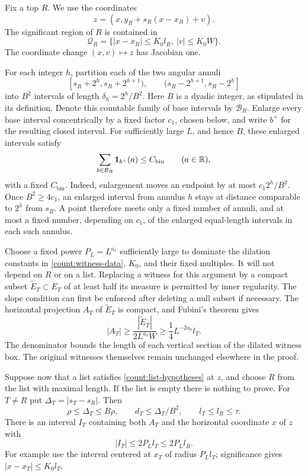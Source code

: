 Fix a top $R$.  We use the coordinates
\[
 z=(x,y_R+s_R(x-x_R)+v).
\]
The significant region of $R$ is contained in
\begin{equation}\label{count:reference-box}
 \mathcal Q_R=\{|x-x_R|\leq K_0l_R,\ |v|\leq K_0W\}.
\end{equation}
The coordinate change $(x,v)\mapsto z$ has Jacobian one.

For each integer $h$, partition each of the two angular annuli
\[
 [s_R+2^h,s_R+2^{h+1}),\qquad
 (s_R-2^{h+1},s_R-2^h]
\]
into $B^2$ intervals of length $\delta_h=2^h/B^2$.
Here $B$ is a dyadic integer, as stipulated in its definition.
Denote this countable family of base intervals by
$\mathcal B_R$.  Enlarge every base interval concentrically by
a fixed factor $c_1$, chosen below, and write $b^+$ for the
resulting closed interval.  For sufficiently large $L$, and hence
$B$, these enlarged intervals satisfy
\begin{equation}\label{count:bin-overlap}
 \sum_{b\in\mathcal B_R}\mathbf 1_{b^+}(a)\leq C_{\mathrm{bin}}
 \qquad(a\in\mathbb R),
\end{equation}
with a fixed $C_{\mathrm{bin}}$.  Indeed, enlargement moves an
endpoint by at most $c_1 2^h/B^2$.  Once $B^2\geq4c_1$, an
enlarged interval from annulus $h$ stays at distance comparable
to $2^h$ from $s_R$.  A point therefore meets only a fixed number
of annuli, and at most a fixed number, depending on $c_1$, of
the enlarged equal-length intervals in each such annulus.

Choose a fixed power $P_L=L^{a_1}$ sufficiently large to dominate
the dilation constants in \eqref{count:witness-data}, $K_0$,
and their fixed multiples.  It will not depend on $R$ or on a
list.  Replacing a witness for this argument by a compact subset
$\widetilde E_T\subset E_T$ of at least half its measure is
permitted by inner regularity.  The slope condition can first
be enforced after deleting a null subset if necessary.  The
horizontal projection $A_T$ of $\widetilde E_T$ is compact, and
Fubini's theorem gives
\begin{equation}\label{count:projection-size}
 |A_T|\geq \frac{|\widetilde E_T|}{2L^{a_0}W}
          \geq \frac14L^{-2a_0}l_T.
\end{equation}
The denominator bounds the length of each vertical section of
the dilated witness box.  The original witnesses themselves
remain unchanged elsewhere in the proof.

Suppose now that a list satisfies \eqref{count:list-hypotheses}
at $z$, and choose $R$ from the list with maximal length.  If
the list is empty there is nothing to prove.  For $T\ne R$ put
$\Delta_T=|s_T-s_R|$.  Then
\begin{equation}\label{count:relative-precision}
 \rho\leq\Delta_T\leq B\rho,\qquad
 d_T\leq\Delta_T/B^2,\qquad l_T\leq l_R\leq\tau.
\end{equation}
There is an interval $I_T$ containing both $A_T$ and the horizontal
coordinate $x$ of $z$ with
\begin{equation}\label{count:witness-interval}
 |I_T|\leq2P_Ll_T\leq2P_Ll_R.
\end{equation}
For example use the interval centered at $x_T$ of radius
$P_Ll_T$; significance gives $|x-x_T|\leq K_0l_T$.

